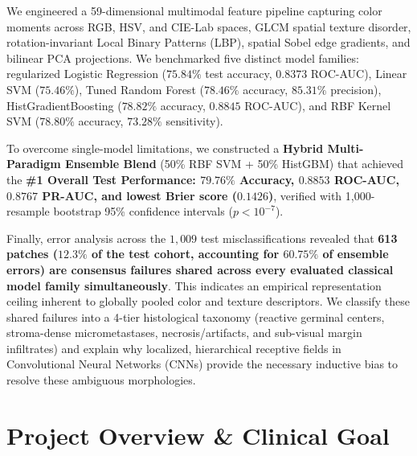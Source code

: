 \documentclass[11pt,a4paper]{article}
\begin{document}
\begin{titlepage}
\begin{center}
\begin{tcolorbox}[colback=boxbg,colframe=boxborder,title=\textbf{Executive Summary \& Abstract},fonttitle=\bfseries\color{primaryblue},width=0.96\textwidth]
    We engineered a 59-dimensional multimodal feature pipeline capturing color moments across RGB, HSV, and CIE-Lab spaces, GLCM spatial texture disorder, rotation-invariant Local Binary Patterns (LBP), spatial Sobel edge gradients, and bilinear PCA projections. We benchmarked five distinct model families: regularized Logistic Regression ($75.84\%$ test accuracy, $0.8373$ ROC-AUC), Linear SVM ($75.46\%$), Tuned Random Forest ($78.46\%$ accuracy, $85.31\%$ precision), HistGradientBoosting ($78.82\%$ accuracy, $0.8845$ ROC-AUC), and RBF Kernel SVM ($78.80\%$ accuracy, $73.28\%$ sensitivity). 
    
    To overcome single-model limitations, we constructed a \textbf{Hybrid Multi-Paradigm Ensemble Blend} (50\% RBF SVM + 50\% HistGBM) that achieved the \textbf{\#1 Overall Test Performance: $79.76\%$ Accuracy, $0.8853$ ROC-AUC, $0.8767$ PR-AUC, and lowest Brier score ($0.1426$)}, verified with 1,000-resample bootstrap 95\% confidence intervals ($p < 10^{-7}$). 
    
    Finally, error analysis across the $1,009$ test misclassifications revealed that \textbf{613 patches ($12.3\%$ of the test cohort, accounting for $60.75\%$ of ensemble errors) are consensus failures shared across every evaluated classical model family simultaneously}. This indicates an empirical representation ceiling inherent to globally pooled color and texture descriptors. We classify these shared failures into a 4-tier histological taxonomy (reactive germinal centers, stroma-dense micrometastases, necrosis/artifacts, and sub-visual margin infiltrates) and explain why localized, hierarchical receptive fields in Convolutional Neural Networks (CNNs) provide the necessary inductive bias to resolve these ambiguous morphologies.
    \end{tcolorbox}
    
    \vfill
\end{center}
\end{titlepage}

\newpage
\tableofcontents
\vspace{1.5em}
\listoffigures
\vspace{1.5em}
\listoftables
\newpage
\section{Project Overview \& Clinical Goal}
\end{document}

